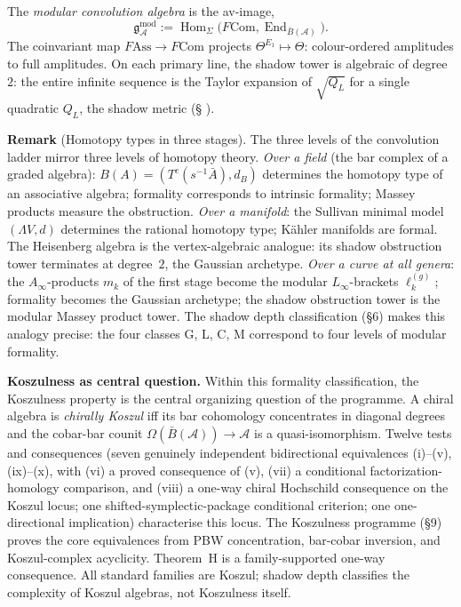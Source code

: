 \documentclass[11pt]{report}
\makeatletter
\theoremstyle{definition}
\theoremstyle{remark}
\providecommand{\cA}{\mathcal{A}}
\providecommand{\barB}{\bar{B}}
\providecommand{\gAmod}{\mathfrak{g}^{\mathrm{mod}}_\cA}
\providecommand{\Ass}{\mathrm{Ass}}
\providecommand{\Com}{\mathrm{Com}}
\DeclareMathOperator{\End}{End}
\DeclareMathOperator{\Hom}{Hom}
\numberwithin{equation}{section}
\let\svy@oldref\ref
\renewcommand{\ref}[1]{%
 \@ifundefined{r@#1}{\textit{full monograph}}{\svy@oldref{#1}}%
}
\makeatother
\begin{document}
The \emph{modular convolution algebra} is the av-image,
\begin{equation}\label{eq:preface-gmod}
\gAmod:=\Hom_\Sigma\bigl(F\Com,\End_{\barB(\cA)}\bigr).
\end{equation}
The coinvariant map $F\!\Ass\to F\Com$ projects
$\Theta^{E_1}\mapsto\Theta$: colour-ordered amplitudes to full
amplitudes. On each primary line, the shadow tower is algebraic of
degree~$2$: the entire infinite sequence is the Taylor expansion of
$\sqrt{Q_L}$ for a single quadratic $Q_L$, the shadow metric
(\S\ref{sec:shadow-metric}).

\medskip
\noindent\textbf{Remark} (Homotopy types in three stages). The three
levels of the convolution ladder mirror three levels of homotopy
theory. \emph{Over a field} (the bar complex of a graded algebra):
$B(A)=(T^c(s^{-1}\bar A),d_B)$ determines
the homotopy type of an associative algebra; formality corresponds to
intrinsic formality; Massey products measure the obstruction.
\emph{Over a manifold}: the Sullivan minimal model $(\Lambda V,d)$
determines the rational homotopy type; K\"ahler manifolds are formal.
The Heisenberg algebra is the vertex-algebraic analogue: its shadow
obstruction tower terminates at degree~$2$, the Gaussian archetype.
\emph{Over a curve at all genera}: the $A_\infty$-products $m_k$ of
the first stage become the modular $L_\infty$-brackets $\ell_k^{(g)}$;
formality becomes the Gaussian archetype; the shadow obstruction tower
is the modular Massey product tower. The shadow depth classification
(\S6) makes this analogy precise: the four classes G, L, C, M
correspond to four levels of modular formality.

\medskip
\noindent\textbf{Koszulness as central question.}\enspace
Within this formality classification, the Koszulness property is the
central organizing question of the programme. A chiral algebra is
\emph{chirally Koszul} iff its bar cohomology concentrates in
diagonal degrees and the cobar-bar counit
$\Omega(\barB(\cA))\to\cA$ is a quasi-isomorphism. Twelve tests and
consequences (seven genuinely independent bidirectional equivalences
\textup{(i)--(v), (ix)--(x)}, with \textup{(vi)} a proved consequence
of \textup{(v)}, \textup{(vii)} a conditional factorization-homology
comparison, and \textup{(viii)} a one-way chiral Hochschild
consequence on the Koszul locus; one shifted-symplectic-package
conditional criterion; one one-directional implication) characterise
this locus. The Koszulness programme
(\S9) proves the core equivalences from PBW concentration, bar-cobar
inversion, and Koszul-complex acyclicity.  Theorem~H is a
family-supported one-way consequence. All standard families are Koszul; shadow depth classifies
the complexity of Koszul algebras, not Koszulness itself.
\end{document}
